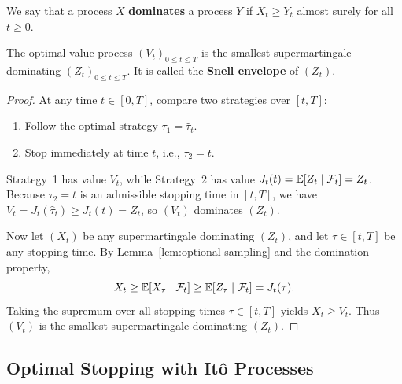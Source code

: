 We say that a process $X$ \textbf{dominates} a process $Y$ if $X_t \ge Y_t$ almost surely for all $t \ge 0$.

\begin{theorem}\label{thm:snell-envelope}
    The optimal value process $(V_t)_{0 \le t \le T}$ is the smallest supermartingale dominating $(Z_t)_{0 \le t \le T}$. It is called the \textbf{Snell envelope} of $(Z_t)$.
\end{theorem}
\begin{proof}
    At any time $t \in [0, T]$, compare two strategies over $[t, T]$:
    \begin{enumerate}
        \item Follow the optimal strategy $\tau_1 = \hat{\tau}_t$.
        \item Stop immediately at time $t$, i.e., $\tau_2 = t$.
    \end{enumerate}
    Strategy~1 has value $V_t$, while Strategy~2 has value $J_t(t) = \mathbb{E}[Z_t \mid \mathcal{F}_t] = Z_t$. Because $\tau_2 = t$ is an admissible stopping time in $[t, T]$, we have $V_t = J_t(\hat{\tau}_t) \ge J_t(t) = Z_t$, so $(V_t)$ dominates $(Z_t)$.

    Now let $(X_t)$ be any supermartingale dominating $(Z_t)$, and let $\tau \in [t, T]$ be any stopping time. By Lemma~\ref{lem:optional-sampling} and the domination property,
    \[
    X_t \ge \mathbb{E}[X_\tau \mid \mathcal{F}_t] \ge \mathbb{E}[Z_\tau \mid \mathcal{F}_t] = J_t(\tau).
    \]
    Taking the supremum over all stopping times $\tau \in [t, T]$ yields $X_t \ge V_t$. Thus $(V_t)$ is the smallest supermartingale dominating $(Z_t)$.
\end{proof}

\subsection*{Optimal Stopping with It\^{o} Processes}

